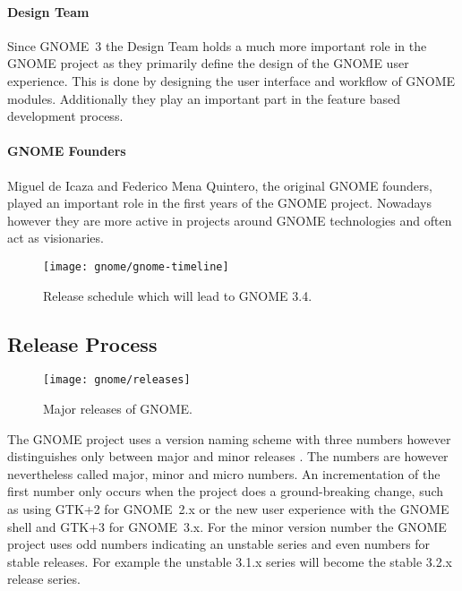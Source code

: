 \paragraph{Design Team}

Since GNOME~3 the Design Team holds a much more important role in the GNOME
project as they primarily define the design of the GNOME user experience. This
is done by designing the user interface and workflow of GNOME modules.
Additionally they play an important part in the feature based development
process.

\paragraph{GNOME Founders}

Miguel de Icaza and Federico Mena Quintero, the original GNOME founders, played
an important role in the first years of the GNOME project. Nowadays however
they are more active in projects around GNOME technologies and often act as
visionaries.

\begin{figure}[h!tbp]
  \centering
  \texttt{[image: gnome/gnome-timeline]}
  \caption[GNOME 3.4 release schedule]{Release schedule which will lead to GNOME 3.4.}
\end{figure}


\subsection{Release Process} %

\begin{figure}[htbp]
  \centering
  \texttt{[image: gnome/releases]}
  \caption[Major releases of GNOME]{Major releases of GNOME.}
\end{figure}

The GNOME project uses a version naming scheme with three numbers however
distinguishes only between major and minor releases
\cite{GNOMEDevelopmentSchedule,GNOMESchedule}. The numbers are however
nevertheless called major, minor and micro numbers. An incrementation of the
first number only occurs when the project does a ground-breaking change, such
as using GTK+2 for GNOME~2.x or the new user experience with the GNOME shell
and GTK+3 for GNOME~3.x. For the minor version number the GNOME project uses
odd numbers indicating an unstable series and even numbers for stable releases.
For example the unstable 3.1.x series will become the stable 3.2.x release
series.

